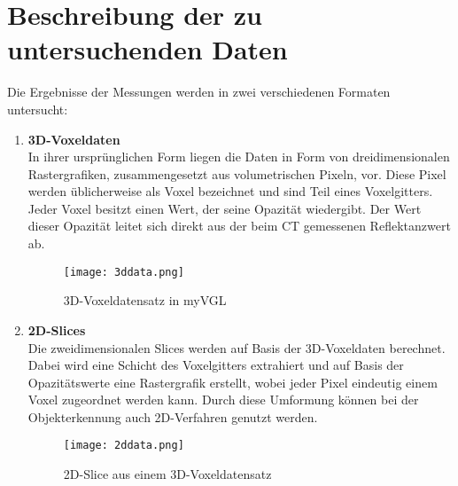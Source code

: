 
\chapter{Beschreibung der zu untersuchenden Daten}
Die Ergebnisse der Messungen werden in zwei verschiedenen Formaten untersucht:

\begin{enumerate}
\item \textbf{3D-Voxeldaten} \\
In ihrer ursprünglichen Form liegen die Daten in Form von dreidimensionalen Rastergrafiken, zusammengesetzt aus volumetrischen Pixeln, vor. Diese Pixel werden üblicherweise als Voxel bezeichnet und sind Teil eines Voxelgitters. Jeder Voxel besitzt einen Wert, der seine Opazität wiedergibt. Der Wert dieser Opazität leitet sich direkt aus der beim CT gemessenen Reflektanzwert ab.

\begin{figure}[H]
  \begin{center}
    \texttt{[image: 3ddata.png]}
    \caption{3D-Voxeldatensatz in myVGL}
    \label{fig:3ddata1}
  \end{center}
\end{figure}
\newpage
\item \textbf{2D-Slices} \\
Die zweidimensionalen Slices werden auf Basis der 3D-Voxeldaten berechnet. Dabei wird eine Schicht des Voxelgitters extrahiert und auf Basis der Opazitätswerte eine Rastergrafik erstellt, wobei jeder Pixel eindeutig einem Voxel zugeordnet werden kann. Durch diese Umformung können bei der Objekterkennung auch 2D-Verfahren genutzt werden.

\begin{figure}[H]
  \begin{center}
    \texttt{[image: 2ddata.png]}
    \caption{2D-Slice aus einem 3D-Voxeldatensatz}
    \label{fig:2ddata1}
  \end{center}
\end{figure}
\end{enumerate}